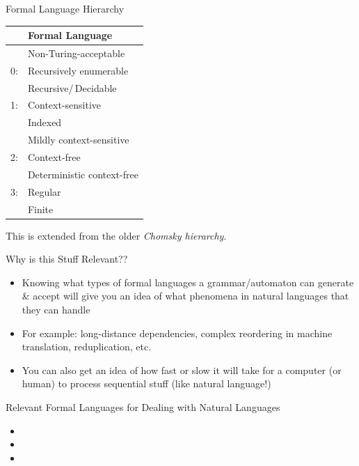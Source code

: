 \documentclass{beamer}
\begin{document}
\begin{frame}{Formal Language Hierarchy}
\begin{center}
\begin{tabular}{|ll|}
\hline
& Formal Language \\
\hline
\hline
& Non-Turing-acceptable\\
\hline
0: & Recursively enumerable \\
\hline
& Recursive/\,Decidable \\
\hline
1: & Context-sensitive \\
\hline
& Indexed \\
\hline
& Mildly context-sensitive \\
\hline
2: & Context-free \\
\hline
& Deterministic context-free \\
\hline
3: & Regular \\
\hline
& Finite \\
\hline
\end{tabular}
\end{center}
\pause
\footnotesize{This is extended from the older \textit{Chomsky hierarchy}.}
\end{frame}


\begin{frame}{Why is this Stuff Relevant??}
\begin{block}{}
\begin{itemize}
	\item Knowing what types of formal languages a grammar/automaton can generate \& accept will give you an idea of what phenomena in natural languages that they can handle
	\pause
	\item For example: long-distance dependencies, complex reordering in machine translation, reduplication, etc.
	\pause
	\item You can also get an idea of how fast or slow it will take for a computer (or human) to process sequential stuff (like natural language!)
\end{itemize}
\end{block}
\end{frame}


\begin{frame}{Relevant Formal Languages for Dealing with Natural Languages}
\begin{block}{}
\begin{itemize}
	\item 
	\item 
	\item 
\end{itemize}
\end{block}
\end{frame}
\end{document}
